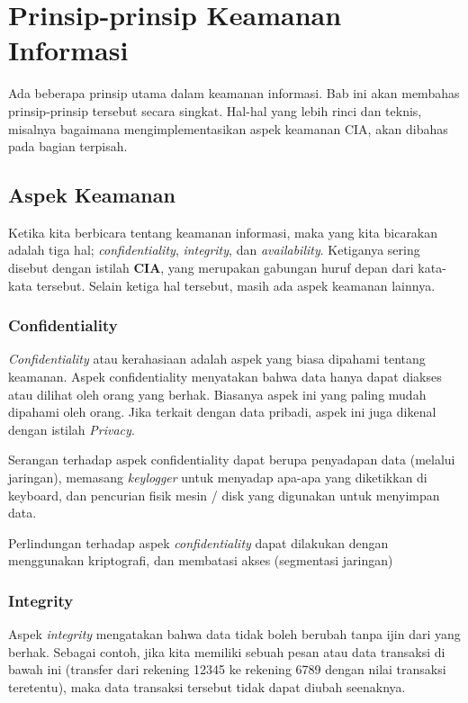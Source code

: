 \chapter{Prinsip-prinsip Keamanan Informasi}

Ada beberapa prinsip utama dalam keamanan informasi.
Bab ini akan membahas prinsip-prinsip tersebut secara singkat.
Hal-hal yang lebih rinci dan teknis, misalnya bagaimana mengimplementasikan
aspek keamanan CIA, akan dibahas pada bagian terpisah.

\section{Aspek Keamanan}
Ketika kita berbicara tentang keamanan informasi, maka yang kita
bicarakan adalah tiga hal;
{\em confidentiality}, {\em integrity}, dan {\em availability}.
Ketiganya sering disebut dengan istilah \textbf{CIA},
yang merupakan gabungan huruf depan dari kata-kata tersebut.
Selain ketiga hal tersebut, masih ada aspek keamanan lainnya.

\subsection{Confidentiality}
{\em Confidentiality} atau kerahasiaan adalah aspek yang biasa dipahami
tentang keamanan.
Aspek confidentiality menyatakan bahwa data hanya dapat diakses
atau dilihat oleh orang yang berhak.
Biasanya aspek ini yang paling mudah dipahami oleh orang.
Jika terkait dengan data pribadi, aspek ini juga dikenal dengan
istilah {\em Privacy}.

Serangan terhadap aspek confidentiality dapat berupa
penyadapan data (melalui jaringan),
memasang {\em keylogger} untuk menyadap apa-apa yang diketikkan
di keyboard,
dan pencurian fisik mesin / disk yang digunakan untuk menyimpan data.

Perlindungan terhadap aspek {\em confidentiality} dapat dilakukan
dengan menggunakan kriptografi, 
dan membatasi akses (segmentasi jaringan)


\subsection{Integrity}
Aspek {\em integrity} mengatakan bahwa data tidak boleh berubah
tanpa ijin dari yang berhak.
Sebagai contoh, jika kita memiliki sebuah pesan atau data 
transaksi di bawah ini (transfer dari rekening 12345 ke rekening 6789 
dengan nilai transaksi teretentu), 
maka data transaksi tersebut tidak dapat diubah seenaknya.

